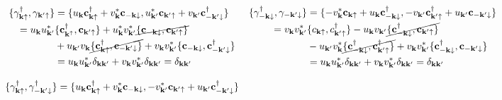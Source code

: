 \documentclass{homework}
\begin{document}
\begin{equation*}
    \begin{array}{cc}
        \begin{split}
        \{{\gamma}_{{\bf k}\uparrow}^\dagger, {\gamma}_{{\bf k}'\uparrow} \} &= \{ u_{{\bf k}} {\bf c}_{{\bf k}\uparrow}^\dagger +  v_{{\bf k}}^* {\bf c}_{-{{\bf k}}\downarrow} , u_{{\bf k}'}^* {\bf c}_{{\bf k}'\uparrow} + v_{{\bf k}'} {\bf c}_{-{{\bf k}'}\downarrow}^\dagger\} \\
        = u_{{\bf k}} u_{{\bf k}'}^* &\{{\bf c}_{{\bf k}^\uparrow}^\dagger, {\bf c}_{{\bf k}' \uparrow}\} 
        + u_{{\bf k}}^* v_{{\bf k}'}^* \cancel{\{{\bf c}_{-{\bf k}\downarrow}, {\bf c}_{{\bf k}'\uparrow}\}} \\
        &+ u_{{\bf k}'} v_{{\bf k}} \cancel{\{{\bf c}_{{\bf k} \uparrow}^\dagger, {\bf c}_{-{\bf k}'\downarrow}\}} 
        + v_{{\bf k}} v_{{\bf k}'}^* \{{\bf c}_{-{\bf k} \downarrow}, {\bf c}_{-{\bf k}' \downarrow}^\dagger\}
        \\
        &= u_{{\bf k}} u_{{\bf k}'}^* \delta_{{\bf k}{\bf k}'} +  v_{{\bf k}} v_{{\bf k}'}^* \delta_{{\bf k}{\bf k}'}= \delta_{{\bf k}{\bf k}'}
        \end{split} & \begin{split}
        \{{\gamma}_{-{\bf k}\downarrow}^\dagger, {\gamma}_{-{\bf k}'\downarrow} \} &= \{-v_{{\bf k}}^* {\bf c}_{{\bf k}\uparrow} + u_{{\bf k}} {\bf c}_{-{{\bf k}}\downarrow}^\dagger, -v_{{\bf k}'} {\bf c}_{{\bf k}'\uparrow}^\dagger + u_{{\bf k}'} {\bf c}_{-{{\bf k}'}\downarrow}\}\\
        = v_{{\bf k}} v_{{\bf k}'}^* &\{c_{{\bf k}\uparrow}, c_{{\bf k}'\uparrow}^\dagger\} - u_{{\bf k}} v_{{\bf k}'} \cancel{\{{\bf c}_{-{\bf k}\downarrow}^\dagger, {\bf c}_{{\bf k}'\uparrow} \}} \\
        &- u_{{\bf k}'} v_{{\bf k}}^* \cancel{\{{\bf c}_{-{\bf k} \downarrow}^\dagger, {\bf c}_{{\bf k}' \uparrow}^\dagger\} } + v_{{\bf k}} v_{{\bf k}'}^* \{{\bf c}_{-{\bf k} \downarrow}^\dagger, {\bf c}_{-{\bf k}' \downarrow}\} \\
        &= u_{{\bf k}} u_{{\bf k}'}^* \delta_{{\bf k}{\bf k}'} +  v_{{\bf k}} v_{{\bf k}'}^* \delta_{{\bf k}{\bf k}'}= \delta_{{\bf k}{\bf k}'}
        \end{split} \\
        \\
        \begin{split}
        \{{\gamma}_{{\bf k}\uparrow}^\dagger, {\gamma}_{-{\bf k}'\downarrow}^\dagger\} &= \{u_{{\bf k}} {\bf c}_{{\bf k}\uparrow}^\dagger + v_{{\bf k}}^* {\bf c}_{-{{\bf k}}\downarrow}, -v_{{\bf k}'}^* {\bf c}_{{\bf k}'\uparrow} + u_{{\bf k}'} {\bf c}_{-{{\bf k}'}\downarrow}^\dagger\} \\

\end{split}
\end{array}
\end{equation*}
\end{document}
